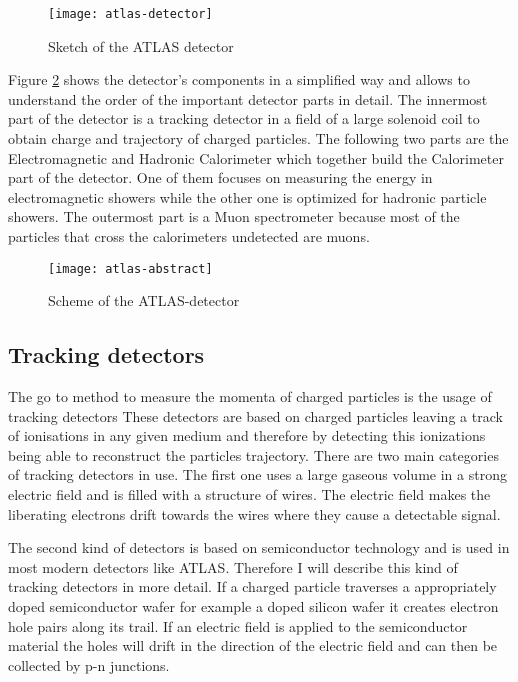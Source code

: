 \begin{figure}[h]
  \centering
  \texttt{[image: atlas-detector]}
  \caption[Sketch of the ATLAS detector]{Sketch of the ATLAS detector \cite{atlasfigures}}
  \label{fig:atlas}
\end{figure}

Figure \ref{fig:atlas_sketch} shows the detector's components in a simplified way and allows to understand the order of the important detector parts in detail. The innermost part of the detector is a tracking detector in a field of a large solenoid coil to obtain charge and trajectory of charged particles.
The following two parts are the Electromagnetic and Hadronic Calorimeter which together build the Calorimeter part of the detector. One of them focuses on measuring the energy in electromagnetic showers while the other one is optimized for hadronic particle showers. The outermost part is a Muon spectrometer because most of the particles that cross the calorimeters undetected are muons.


\begin{figure}[h]
  \centering
  \texttt{[image: atlas-abstract]}
  \caption[Sketch of the transversal section of the ATLAS detector]{Scheme of the ATLAS-detector \cite{atlasfigures}}
  \label{fig:atlas_sketch}
\end{figure}

\subsection{Tracking detectors}

The go to method to measure the momenta of charged particles is the usage of tracking detectors
These detectors are based on charged particles leaving a track of ionisations in any given medium and therefore by detecting this ionizations being able to reconstruct the particles trajectory.
There are two main categories of tracking detectors in use. The first one uses a large gaseous volume in a strong electric field and is filled with a structure of wires. The electric field makes the liberating electrons drift towards the wires where they cause a detectable signal.

The second kind of detectors is based on semiconductor technology and is used in most modern detectors like ATLAS. Therefore I will describe this kind of tracking detectors in more detail.
If a charged particle traverses a appropriately doped semiconductor wafer for example a doped silicon wafer it creates electron hole pairs along its trail. If an electric field is applied to the semiconductor material the holes will drift in the direction of the electric field and can then be collected by p-n junctions.

